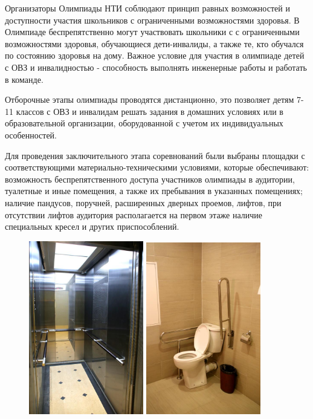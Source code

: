 Организаторы Олимпиады НТИ соблюдают принцип равных возможностей и доступности участия школьников с ограниченными возможностями здоровья. В Олимпиаде беспрепятственно могут участвовать школьники с с ограниченными возможностями здоровья, обучающиеся дети-инвалиды, а также те, кто обучался по состоянию здоровья на дому. Важное условие для участия в олимпиаде детей с ОВЗ и инвалидностью - способность выполнять инженерные работы и работать в команде.


Отборочные этапы олимпиады проводятся дистанционно, это позволяет детям 7-11 классов с ОВЗ и инвалидам решать задания в домашних условиях или в образовательной организации, оборудованной с учетом их индивидуальных особенностей.

Для проведения заключительного этапа соревнований были выбраны площадки с соответствующими материально-техническими условиями, которые обеспечивают: возможность беспрепятственного доступа участников олимпиады в аудитории, туалетные и иные помещения, а также их пребывания в указанных помещениях; наличие пандусов, поручней, расширенных дверных проемов, лифтов, при отсутствии лифтов аудитория располагается на первом этаже наличие специальных кресел и других приспособлений. 

\begin{figure}[H]
    \begin{center}
    \includegraphics[width=5cm]{history/info/smart_city/i2}
    \includegraphics[width=5cm]{history/info/smart_city/i3}
\end{center}
\end{figure}

